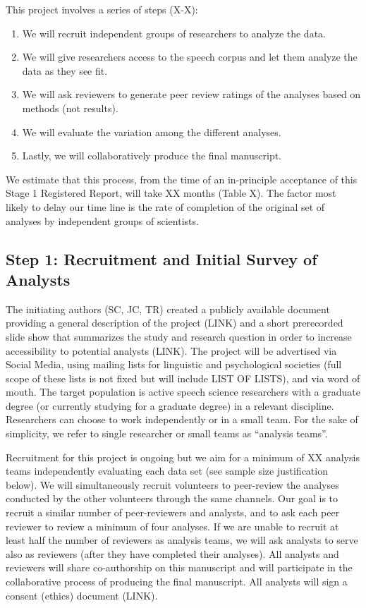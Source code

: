 \documentclass[
  english,
  man,floatsintext]{apa6}
\providecommand{\tightlist}{%
  \setlength{\itemsep}{0pt}\setlength{\parskip}{0pt}}
\begin{document}
This project involves a series of steps (X-X):

\begin{enumerate}
\def\labelenumi{\arabic{enumi}.}
\tightlist
\item
  We will recruit independent groups of researchers to analyze the data.
\item
  We will give researchers access to the speech corpus and let them analyze the data as they see fit.
\item
  We will ask reviewers to generate peer review ratings of the analyses based on methods (not results).
\item
  We will evaluate the variation among the different analyses.
\item
  Lastly, we will collaboratively produce the final manuscript.
\end{enumerate}

We estimate that this process, from the time of an in-principle acceptance of this Stage 1 Registered Report, will take XX months (Table X).
The factor most likely to delay our time line is the rate of completion of the original set of analyses by independent groups of scientists.

\hypertarget{step-1-recruitment-and-initial-survey-of-analysts}{%
\subsection{Step 1: Recruitment and Initial Survey of Analysts}\label{step-1-recruitment-and-initial-survey-of-analysts}}

The initiating authors (SC, JC, TR) created a publicly available document providing a general description of the project (LINK) and a short prerecorded slide show that summarizes the study and research question in order to increase accessibility to potential analysts (LINK).
The project will be advertised via Social Media, using mailing lists for linguistic and psychological societies (full scope of these lists is not fixed but will include LIST OF LISTS), and via word of mouth.
The target population is active speech science researchers with a graduate degree (or currently studying for a graduate degree) in a relevant discipline.
Researchers can choose to work independently or in a small team.
For the sake of simplicity, we refer to single researcher or small teams as \enquote{analysis teams}.

Recruitment for this project is ongoing but we aim for a minimum of XX analysis teams independently evaluating each data set (see sample size justification below).
We will simultaneously recruit volunteers to peer-review the analyses conducted by the other volunteers through the same channels.
Our goal is to recruit a similar number of peer-reviewers and analysts, and to ask each peer reviewer to review a minimum of four analyses.
If we are unable to recruit at least half the number of reviewers as analysis teams, we will ask analysts to serve also as reviewers (after they have completed their analyses).
All analysts and reviewers will share co-authorship on this manuscript and will participate in the collaborative process of producing the final manuscript.
All analysts will sign a consent (ethics) document (LINK).
\end{document}
